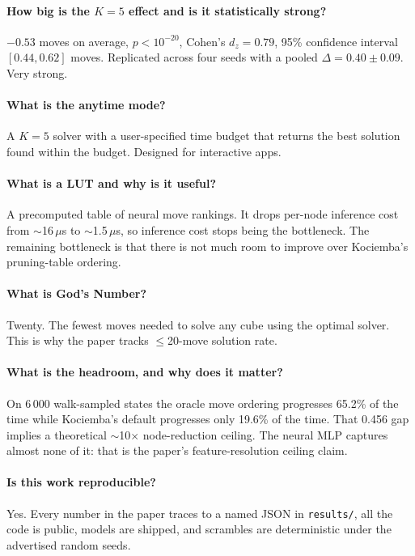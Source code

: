 \documentclass[11pt,a4paper]{article}
\begin{document}
\paragraph{How big is the $K=5$ effect and is it statistically strong?}
$-0.53$ moves on average, $p < 10^{-20}$, Cohen's $d_z = 0.79$, 95\%
confidence interval $[0.44, 0.62]$ moves. Replicated across four seeds
with a pooled $\Delta = 0.40 \pm 0.09$. Very strong.

\paragraph{What is the anytime mode?}
A $K=5$ solver with a user-specified time budget that returns the best
solution found within the budget. Designed for interactive apps.

\paragraph{What is a LUT and why is it useful?}
A precomputed table of neural move rankings. It drops per-node
inference cost from $\sim$16\,$\mu$s to $\sim$1.5\,$\mu$s, so
inference cost stops being the bottleneck. The remaining bottleneck is
that there is not much room to improve over Kociemba's pruning-table
ordering.

\paragraph{What is God's Number?}
Twenty. The fewest moves needed to solve any cube using the optimal
solver. This is why the paper tracks $\leq$20-move solution rate.

\paragraph{What is the headroom, and why does it matter?}
On 6\,000 walk-sampled states the oracle move ordering progresses
65.2\% of the time while Kociemba's default progresses only 19.6\% of
the time. That 0.456 gap implies a theoretical $\sim$10$\times$
node-reduction ceiling. The neural MLP captures almost none of it:
that is the paper's feature-resolution ceiling claim.

\paragraph{Is this work reproducible?}
Yes. Every number in the paper traces to a named JSON in
\texttt{results/}, all the code is public, models are shipped, and
scrambles are deterministic under the advertised random seeds.
\end{document}
